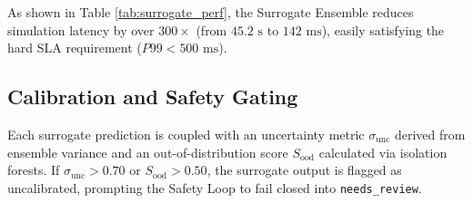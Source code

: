As shown in Table \ref{tab:surrogate_perf}, the Surrogate Ensemble reduces simulation latency by over $300\times$ (from $45.2\text{ s}$ to $142\text{ ms}$), easily satisfying the hard SLA requirement ($P99 < 500\text{ ms}$).

\subsection{Calibration and Safety Gating}
Each surrogate prediction is coupled with an uncertainty metric $\sigma_{\text{unc}}$ derived from ensemble variance and an out-of-distribution score $S_{\text{ood}}$ calculated via isolation forests. If $\sigma_{\text{unc}} > 0.70$ or $S_{\text{ood}} > 0.50$, the surrogate output is flagged as uncalibrated, prompting the Safety Loop to fail closed into \texttt{needs\_review}.
